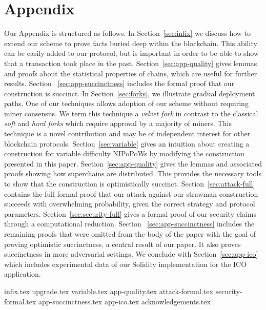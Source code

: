 \appendix
\section*{Appendix}

Our Appendix is structured as follows.
In Section~\ref{sec:infix} we discuss how to extend our scheme to prove facts
buried deep within the blockchain. This ability can be easily added to our
protocol, but is important in order to be able to show that a transaction took
place in the past.
Section~\ref{sec:app-quality} gives lemmas and proofs about the statistical
properties of chains, which are useful for further results.
Section~
\ref{sec:app-succinctness} includes the formal proof that our construction is succinct.
In Section~\ref{sec:forks}, we illustrate
gradual deployment paths. One of our techniques allows adoption of our scheme
without requiring miner consensus. We term this technique a \emph{velvet fork}
in contrast to the classical \emph{soft} and \emph{hard forks} which require
approval by a majority of miners. This technique is a novel contribution and may
be of independent interest for other blockchain protocols.
Section~\ref{sec:variable} gives an intuition about creating a construction for
variable difficulty NIPoPoWs by modifying the construction presented in this
paper.
Section~\ref{sec:app-quality} gives the lemmas and associated proofs showing how
superchains are distributed. This provides the necessary tools to show that the
construction is optimistically succinct.
Section~\ref{sec:attack-full} contains
the full formal proof that our attack against our strawman construction succeeds with overwhelming probability, given the correct
strategy and protocol parameters. Section~\ref{sec:security-full} gives a formal
proof of our security claims through a computational reduction. Section~
\ref{sec:app-succinctness} includes the remaining proofs that were omitted from
the body of the paper with the goal of proving optimistic succinctness, a
central result of our paper. It also proves succinctness in more adversarial
settings. We conclude with
Section~\ref{sec:app-ico} which includes experimental data of our Solidity
implementation for the ICO application.

{infix.tex}
{upgrade.tex}
{variable.tex}
{app-quality.tex}
{attack-formal.tex}
{security-formal.tex}
{app-succinctness.tex}
{app-ico.tex}
{acknowledgements.tex}
